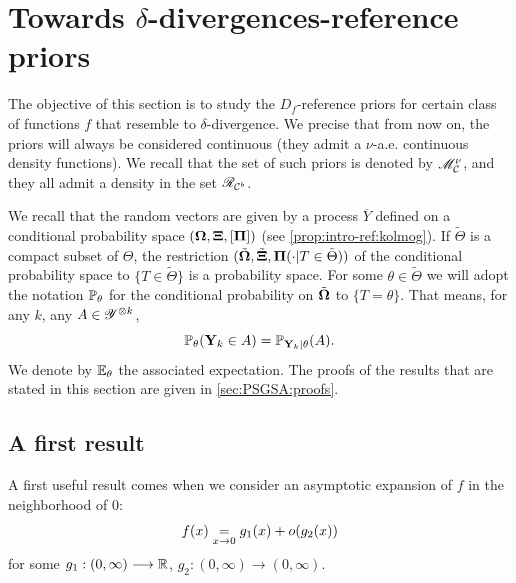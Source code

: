 \section{Towards $\delta$-divergences-reference priors}
\label{sec:PSGSA:towardsdelta}

The objective of this section is to study the $D_f$-reference priors for certain class of functions $f$ that resemble to $\delta$-divergence.
We precise that from now on, the priors will always be considered continuous (they admit a $\nu$-a.e. continuous density functions). We recall that the set of such priors is denoted by $\mathscr{M}^\nu_{\mathcal{C}} $, and they all admit a density in the set $\mathscr{R}_{\mathcal{C}^b}$. %

We recall that the random vectors are given by a process $\overline{Y}$ defined on a conditional probability space $(\mathbf{\Omega},\mathbf{\Xi},[\mathbf{\Pi}] )$ (see \cref{prop:intro-ref:kolmog}). If $\tilde\Theta$ is a compact subset of $\Theta$, the restriction $(\tilde{\mathbf{\Omega}},\tilde{\mathbf{\Xi}}, \mathbf{\Pi}(\cdot|T\in\tilde\Theta))$ of the conditional probability space to $\{T\in\tilde\Theta\}$ is a probability space.
For some $\theta\in\tilde\Theta$ we will adopt the notation $\mathbb{P}_\theta$ for the conditional probability on $\tilde{\mathbf{\Omega}}$ to $\{T=\theta\}$. That means, for any $k$, any $A\in\mathscr{Y}^{\otimes k}$, 
    \begin{equation}
        \mathbb{P}_\theta(\mathbf{Y}_k\in A) = \mathbb{P}_{\mathbf{Y}_k|\theta}(A).
    \end{equation}
We denote by $\mathbb{E}_\theta$ the associated expectation.
The proofs of the results that are stated in this section are given in \cref{sec:PSGSA:proofs}.


\subsection{A first result}

A first useful result comes when we consider an asymptotic expansion of $f$ in the neighborhood of $0$:
\begin{equation}
    f(x) \overset{}{\underset{x\rightarrow0}{=}} g_1(x) + o(g_2(x))
\end{equation}
for some $g_1:(0,\infty)\longrightarrow\mathbb{R}$, $g_2:(0,\infty)\to(0,\infty)$.


